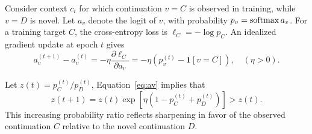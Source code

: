 Consider context $c_i$ for which continuation $v=C$ is observed in training, while $v=D$ is novel. Let $a_v$ denote the logit of $v$, with probability $p_v=\operatorname{softmax}{a_v}$. For a training target $C$, the cross-entropy loss is $\ell_C=-\log p_C$. An idealized gradient update at epoch $t$ gives
\begin{equation}
a_v^{(t+1)}-a_v^{(t)}=-\eta\frac{\partial\ell_C}{\partial a_v}=-\eta\left(p_v^{(t)}-\mathbf{1}[v=C]\right),\quad (\eta>0).
\label{eq:av}
\end{equation}

Let $z(t)=p_C^{(t)}/p_D^{(t)}$, Equation~\eqref{eq:av} implies that
\begin{equation}
z(t+1)=z(t)\exp \left[\eta \left(1-p_C^{(t)}+p_D^{(t)} \right) \right]>z(t).
\label{eq:zt}
\end{equation}
This increasing probability ratio reflects sharpening in favor of the observed continuation $C$ relative to the novel continuation $D$.




